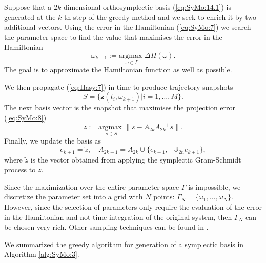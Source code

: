 Suppose that a $2k$ dimensional {\edit orthosymplectic basis (\ref{eq:SyMo:14.1})} is generated at the $k$-th step of the greedy method and we seek to enrich it by two additional vectors. Using the error in the Hamiltonian (\ref{eq:SyMo:7}) we search the parameter space to find the value that maximises the error in the Hamiltonian
\begin{equation} \label{eq:SyMo:14.5}
	\omega_{k+1} := \underset{\omega\in \Gamma}{\text{argmax }}\Delta H(\omega).
\end{equation}
The goal is to approximate the Hamiltonian function as well as possible. 

We then propagate (\ref{eq:Hasy:7}) in time to produce trajectory snapshots 
\begin{equation}
	S=\{ \mathbf z(t_i,\omega_{k+1}) | i = 1,\dots,M \}.
\end{equation} 
The next basis vector is the snapshot that maximises the projection error (\ref{eq:SyMo:8})
{\edit 
\begin{equation} \label{eq:SyMo:14.6}
	z := \underset{s\in S}{\text{argmax }} \| s - A_{2k}{A_{2k}}^+s \|.
\end{equation}
}
Finally, we update the basis as
{\edit
\begin{equation} \label{eq:SyMo:14.7}
	e_{k+1} = \tilde z, \quad A_{2k+1} = A_{2k}\cup \{ e_{k+1} , -\mathbb J_{2n}e_{k+1} \},
\end{equation}
}
where $\tilde z$ is the vector obtained from applying the symplectic Gram-Schmidt process to $z$. 

Since the maximization over the entire parameter space $\Gamma$ is impossible, we discretize the parameter set into a grid with $N$ points: $\Gamma_N = \{ \omega_1,\dots,\omega_N\}$. However, since the selection of parameters only require the evaluation of the error in the Hamiltonian and not time integration of the original system, then $\Gamma_N$ can be chosen very rich. Other sampling techniques can be found in \cite{Quarteroni:2016wi}.

We summarized the greedy algorithm for generation of a symplectic basis in Algorithm \ref{alg:SyMo:3}.




